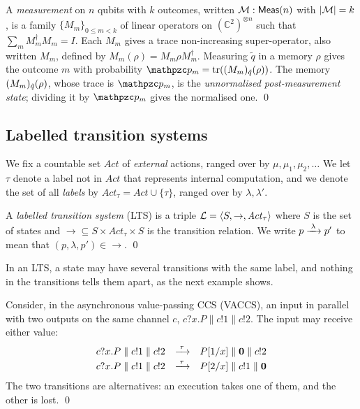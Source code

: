 \begin{definition}[Measurement]\label{def:meas}
A \emph{measurement} on $n$ qubits with $k$ outcomes, written
$\mathcal{M} : \mathsf{Meas}(n)$ with $|\mathcal{M}| = k$, is a family $\{M_m\}_{0 \le m < k}$ of
linear operators on $(\mathbb{C}^2)^{\otimes n}$ such that
$\sum_{m} M_m^\dagger M_m = I$. Each $M_m$ gives a trace non-increasing
super-operator, also written $M_m$, defined by
$M_m(\rho) = M_m \rho M_m^\dagger$. Measuring $\tilde q$ in a memory $\rho$
gives the outcome $m$ with probability $\prob_m = \tr(\br)$. The memory $(M_m)_{\tilde q}(\rho)$,
whose trace is $\prob_m$, is the \emph{unnormalised post-measurement state};
dividing it by $\prob_m$ gives the normalised one.
\qed
\end{definition}

\subsection{Labelled transition systems}\label{sec:lts-prelim}

We fix a countable set $\mathit{Act}$ of
\emph{external} actions, ranged over by $\mu, \mu_1, \mu_2, \ldots$ We let
$\tau$ denote a label not in $\mathit{Act}$ that represents internal
computation, and we denote the set of all \emph{labels} by
$\mathit{Act}_\tau = \mathit{Act} \cup \{\tau\}$, ranged over by
$\lambda, \lambda'$.

\begin{definition}[LTS]\label{def:lts}
A \emph{labelled transition system} (LTS) is a triple
$\mathcal{L} = \langle S, \rightarrow, \mathit{Act}_\tau \rangle$ where $S$ is the set
of states and
${\rightarrow} \subseteq S \times \mathit{Act}_\tau \times S$ is the
transition relation. We write $p \xrightarrow{\;\lambda\;} p'$ to mean that
$(p, \lambda, p') \in {\rightarrow}$.
\qed
\end{definition}

In an LTS, a state may have several transitions with the same label, and
nothing in the transitions tells them apart, as the next example shows.

\begin{example}\label{ex:pure}
Consider, in the asynchronous value-passing CCS (VACCS), an input in
parallel with two outputs on the same channel $c$,
$c?x.P \parallel c!1 \parallel c!2$. The input may receive either value:
\[
\begin{array}{rcl}
c?x.P \parallel c!1 \parallel c!2 &\xrightarrow{\;\tau\;}& P[1/x] \parallel \mathbf{0} \parallel c!2\\[2pt]
c?x.P \parallel c!1 \parallel c!2 &\xrightarrow{\;\tau\;}& P[2/x] \parallel c!1 \parallel \mathbf{0}
\end{array}
\]
The two transitions are alternatives: an execution takes one of them, and
the other is lost.
\qed
\end{example}

